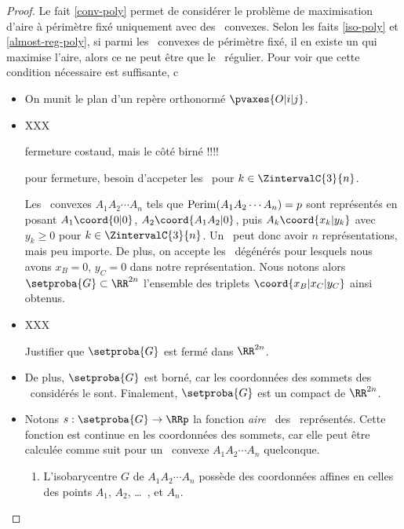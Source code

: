 \begin{proof}
	Le fait \ref{conv-poly} permet de considérer le problème de maximisation d'aire à périmètre fixé uniquement avec des \ngones\ convexes.
	Selon les faits \ref{iso-poly} et \ref{almost-reg-poly}, si parmi les \ngones\ convexes de périmètre fixé, il en existe un qui maximise l'aire, alors ce ne peut être que le \ngone\ régulier.
	Pour voir que cette condition nécessaire est suffisante, c
	\begin{itemize}
		\item On munit le plan d'un repère orthonormé $\pvaxes{O | i | j}$. 

		\item 
		XXX
		
		fermeture costaud, mais le côté birné !!!!
		
		pour fermeture, besoin d'accpeter les \kgones\ pour $k \in \ZintervalC{3}{n}$.
		
		Les \ngones\ convexes $A_1 A_2 \cdots A_n$ tels que $\mathrm{Perim}(A_1 A_2 \cdots A_n) = p$ sont représentés en posant $A_1\coord{0 | 0}$, $A_2\coord{A_1 A_2 | 0}$, puis $A_k\coord{x_k | y_k}$ avec $y_k \geq 0$ pour $k \in \ZintervalC{3}{n}$. Un \ngone\ peut donc avoir $n$ représentations, mais peu importe.
		De plus, on accepte les \ngones\ dégénérés pour lesquels nous avons $x_B = 0$, $y_C = 0$ dans notre représentation.
		Nous notons alors $\setproba{G} \subset \RR^{2n}$ l'ensemble des triplets $\coord{x_B | x_C | y_C}$ ainsi obtenus.

		\item XXX
		
		Justifier que $\setproba{G}$ est fermé dans $\RR^{2n}$.






		\item De plus, $\setproba{G}$ est borné, car les coordonnées des sommets des \kgones\ considérés le sont.		
		Finalement, $\setproba{G}$ est un compact de $\RR^{2n}$.


		\item Notons $s: \setproba{G} \rightarrow \RRp$ la fonction \og \emph{aire} \fg\ des \ngones\ représentés. 
		Cette fonction est continue en les coordonnées des sommets, car elle peut être calculée comme suit pour un \ngone\ convexe $A_1 A_2 \cdots A_n$ quelconque.
		\begin{enumerate}
			\item L'isobarycentre $G$ de $A_1 A_2 \cdots A_n$ possède des coordonnées affines en celles des points $A_1$, $A_2$, \dots\ , et $A_n$.


\end{enumerate}
\end{itemize}
\end{proof}
